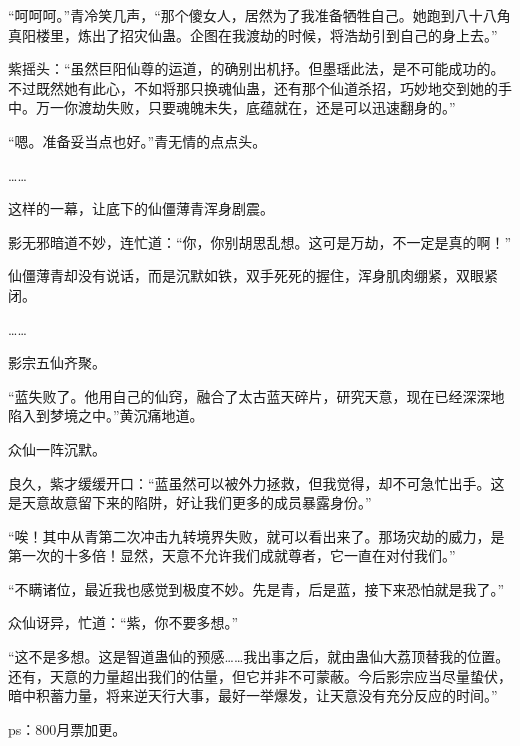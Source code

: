 \begin{this_body}
“呵呵呵。”青冷笑几声，“那个傻女人，居然为了我准备牺牲自己。她跑到八十八角真阳楼里，炼出了招灾仙蛊。企图在我渡劫的时候，将浩劫引到自己的身上去。”

紫摇头：“虽然巨阳仙尊的运道，的确别出机抒。但墨瑶此法，是不可能成功的。不过既然她有此心，不如将那只换魂仙蛊，还有那个仙道杀招，巧妙地交到她的手中。万一你渡劫失败，只要魂魄未失，底蕴就在，还是可以迅速翻身的。”

“嗯。准备妥当点也好。”青无情的点点头。

……

这样的一幕，让底下的仙僵薄青浑身剧震。

影无邪暗道不妙，连忙道：“你，你别胡思乱想。这可是万劫，不一定是真的啊！”

仙僵薄青却没有说话，而是沉默如铁，双手死死的握住，浑身肌肉绷紧，双眼紧闭。

……

影宗五仙齐聚。

“蓝失败了。他用自己的仙窍，融合了太古蓝天碎片，研究天意，现在已经深深地陷入到梦境之中。”黄沉痛地道。

众仙一阵沉默。

良久，紫才缓缓开口：“蓝虽然可以被外力拯救，但我觉得，却不可急忙出手。这是天意故意留下来的陷阱，好让我们更多的成员暴露身份。”

“唉！其中从青第二次冲击九转境界失败，就可以看出来了。那场灾劫的威力，是第一次的十多倍！显然，天意不允许我们成就尊者，它一直在对付我们。”

“不瞒诸位，最近我也感觉到极度不妙。先是青，后是蓝，接下来恐怕就是我了。”

众仙讶异，忙道：“紫，你不要多想。”

“这不是多想。这是智道蛊仙的预感……我出事之后，就由蛊仙大荔顶替我的位置。还有，天意的力量超出我们的估量，但它并非不可蒙蔽。今后影宗应当尽量蛰伏，暗中积蓄力量，将来逆天行大事，最好一举爆发，让天意没有充分反应的时间。”

ps：800月票加更。

\end{this_body}

